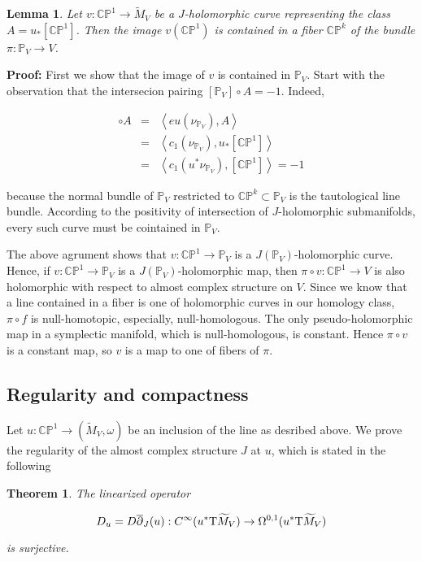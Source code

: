 \documentclass[a4paper,14pt]{article}
\newcommand{\B}[1]{\mathbb #1}
\newcommand{\Om}{{\Omega}}
\newcommand{\om}{{\omega}}
\newcommand{\qed}{\rightline {$\Box $}}
\newcommand{\blowMV}{\widetilde {M}_V}
\newcommand{\cp}{{\B C\B P}}
\newcommand{\T }{\hbox {\text {T}}}
\newcommand{\pf}{\NI {\bf Proof: }}
\newcommand{\BS}{{\bigskip}}
\newcommand{\NI}{{\noindent}}
\newtheorem{thm}[theorem]{Theorem}
\newtheorem{lemma}[theorem]{Lemma}
\numberwithin{equation}{section}
\begin{document}
\begin{lemma}\label{AL:nontransversal}
Let $v:\cp ^1 \to \blowMV $ be a $J$-holomorphic
curve representing the class $A=u_*[\cp ^1]$. Then the image
$v(\cp ^1)$ is contained in a fiber $\cp ^k$ of the
bundle $\pi:\B P_V\to V$.
\end{lemma}

\pf
First we
show that the image of $v$ is contained in
$\B P_V$. Start with the
observation that the intersecion pairing
$[\B P_V] \circ A = -1$.
Indeed,

\begin{eqnarray*}
[\B P_V]\circ A &=& \left <eu(\nu _{\B P_V}),A \right >\\
&=&
\left <c_1(\nu _{\B P_V}),u_*[\cp ^1]\right > \\
&=&
\left <c_1(u^*\nu _{\B P_V}), [\cp ^1]\right > = -1
\end{eqnarray*}


\NI
because the normal bundle of  $\B P_V$ restricted
to $\cp ^k\subset \B P_V$ is the tautological
line bundle.
According to
the positivity of intersection of $J$-holomorphic
submanifolds, every such curve must be
cointained in $\B P_V$.

The above agrument shows that $v:\cp ^1\to \B P_V$
is a $J(\B P_V)$-holomorphic curve.
Hence, if $v: \cp ^1 \to \B P_V$ is a $J(\B P_V)$-holomorphic map, then
$\pi \circ v: \cp ^1 \to V$ is also
holomorphic with respect to almost complex structure on $V$.
Since we know that a line contained in a fiber is
one of holomorphic curves in our homology class, $\pi \circ f$ is
null-homotopic,
especially, null-homologous. The only pseudo-holomorphic map in a symplectic
manifold, which is null-homologous, is constant.
Hence $\pi \circ v$ is a constant map, so $v$ is a map to one of fibers
of $\pi$.

\qed



\BS


\subsection{Regularity and compactness}



\BS

Let $u:\cp ^1\to (\blowMV,\om )$ be an inclusion of
the line as desribed above.
We prove the regularity of the almost complex structure
$J$ at $u$, which is stated in the following


\begin{thm}\label{AT:reg}
The linearized operator

$$D_u=D\overline{\partial }_J(u): C^{\infty }(u^*\T \blowMV)
\to \Om ^{0,1}(u^*\T \blowMV )$$

\NI
is surjective.
\end{thm}
\end{document}

